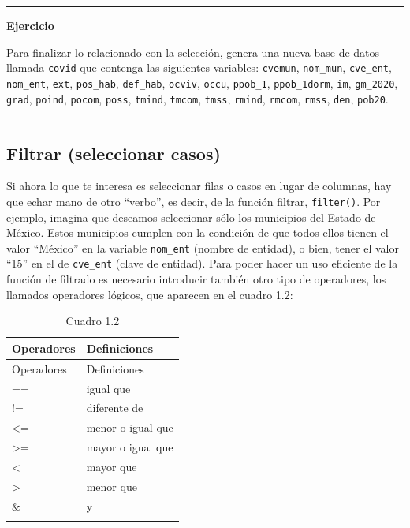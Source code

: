 \documentclass[
  11pt,
  oneside]{book}
\begin{document}
\begin{center}\rule{0.5\linewidth}{0.5pt}\end{center}

\textbf{Ejercicio}

Para finalizar lo relacionado con la selección, genera una nueva base de datos llamada \texttt{covid} que contenga las siguientes variables: \texttt{cvemun}, \texttt{nom\_mun}, \texttt{cve\_ent}, \texttt{nom\_ent}, \texttt{ext}, \texttt{pos\_hab}, \texttt{def\_hab}, \texttt{ocviv}, \texttt{occu}, \texttt{ppob\_1}, \texttt{ppob\_1dorm}, \texttt{im}, \texttt{gm\_2020}, \texttt{grad}, \texttt{poind}, \texttt{pocom}, \texttt{poss}, \texttt{tmind}, \texttt{tmcom}, \texttt{tmss}, \texttt{rmind}, \texttt{rmcom}, \texttt{rmss}, \texttt{den}, \texttt{pob20}.

\begin{center}\rule{0.5\linewidth}{0.5pt}\end{center}

\hypertarget{filtrar-seleccionar-casos}{%
\subsection{Filtrar (seleccionar casos)}\label{filtrar-seleccionar-casos}}

Si ahora lo que te interesa es seleccionar filas o casos en lugar de columnas, hay que echar mano de otro ``verbo'', es decir, de la función filtrar, \texttt{filter()}. Por ejemplo, imagina que deseamos seleccionar sólo los municipios del Estado de México. Estos municipios cumplen con la condición de que todos ellos tienen el valor ``México'' en la variable \texttt{nom\_ent} (nombre de entidad), o bien, tener el valor ``15'' en el de \texttt{cve\_ent} (clave de entidad). Para poder hacer un uso eficiente de la función de filtrado es necesario introducir también otro tipo de operadores, los llamados operadores lógicos, que aparecen en el cuadro 1.2:

\begin{longtable}[]{@{}ll@{}}
\caption{Cuadro 1.2}\tabularnewline
\toprule()
Operadores & Definiciones \\
\midrule()
\endfirsthead
\toprule()
Operadores & Definiciones \\
\midrule()
\endhead
== & igual que \\
!= & diferente de \\
\textless= & menor o igual que \\
\textgreater= & mayor o igual que \\
\textless{} & mayor que \\
\textgreater{} & menor que \\
\& & y \\
& \\
\bottomrule()
\end{longtable}
\end{document}
